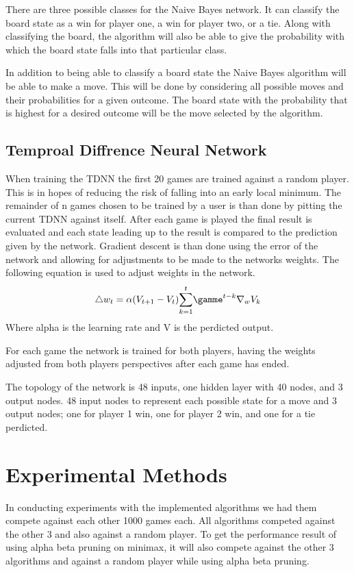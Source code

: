 \documentclass[12pt,letterpaper]{article}
\begin{document}
There are three possible classes for the Naive Bayes network. It can classify the board state as a win for player one, a win for player two, or a tie. Along with classifying the board, the algorithm will also be able to give the probability with which the board state falls into that particular class.

In addition to being able to classify a board state the Naive Bayes algorithm will be able to make a move. This will be done by considering all possible moves and their probabilities for a given outcome. The board state with the probability that is highest for a desired outcome will be the move selected by the algorithm. 

\subsection{Temproal Diffrence Neural Network}
When training the TDNN the first 20 games are trained against a random player. This is in hopes of reducing the risk of falling into an early local minimum. The remainder of n games chosen to be trained by a user is than done by pitting the current TDNN against itself. After each game is played the final result is evaluated and each state leading up to the result is compared to the prediction given by the network. Gradient descent is than done using the error of the network and allowing for adjustments to be made to the networks weights. The following equation is used to adjust weights in the network. 
\[
{\triangle} w_t = \alpha (V _{t + 1} - V _t)  \overset{t}{\sum_{k = 1}} {\gamme}^{t - k} {\nabla}_w V_k
\]
Where alpha is the learning rate and V is the perdicted output.

For each game the network is trained for both players, having the weights adjusted from both players perspectives after each game has ended.

The topology of the network is 48 inputs, one hidden layer with 40 nodes, and 3 output nodes. 48 input nodes to represent each possible state for a move and 3 output nodes; one for player 1 win, one for player 2 win, and one for a tie perdicted. 

\section{Experimental Methods}
In conducting experiments with the implemented algorithms we had them compete against each other 1000 games each. All algorithms competed against the other 3 and also against a random player. To get the performance result of using alpha beta pruning on minimax, it will also compete against the other 3 algorithms and against a random player while using alpha beta pruning. 
\end{document}
